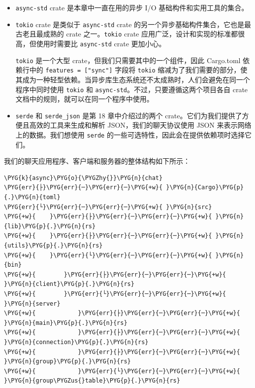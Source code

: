 \begin{itemize}
\item \texttt{async-std} crate 是本章中一直在用的异步 I/O 基础构件和实用工具的集合。
\item \texttt{tokio} crate 是类似于 \texttt{async-std} crate 的另一个异步基础构件集合，它也是最古老且最成熟的 crate 之一。\texttt{tokio} crate 应用广泛，设计和实现的标准都很高，但使用时需要比 \texttt{async-std} crate 更加小心。

\texttt{tokio} 是一个大型 crate，但我们只需要其中的一个组件，因此 Cargo.toml 依赖行中的 \texttt{features = ["sync"]} 字段将 \texttt{tokio} 缩减为了我们需要的部分，使其成为一种轻型依赖。当异步库生态系统还不太成熟时，人们会避免在同一个程序中同时使用 \texttt{tokio} 和 \texttt{async-std}。不过，只要遵循这两个项目各自 crate 文档中的规则，就可以在同一个程序中使用。
\item \texttt{serde} 和 \texttt{serde\_json} 是第 18 章中介绍过的两个 crate。它们为我们提供了方便且高效的工具来生成和解析 JSON，我们的聊天协议使用 JSON 来表示网络上的数据。我们想使用 \texttt{serde} 的一些可选特性，因此会在提供依赖项时选择它们。
\end{itemize}

我们的聊天应用程序、客户端和服务器的整体结构如下所示：

\begin{Verbatim}[commandchars=\\\{\},breaklines=true,breakanywhere=true,fontsize=\codefont,xleftmargin=17bp]
\PYG{k}{async}\PYG{o}{\PYGZhy{}}\PYG{n}{chat}
\PYG{err}{├}\PYG{err}{─}\PYG{err}{─}\PYG{+w}{ }\PYG{n}{Cargo}\PYG{p}{.}\PYG{n}{toml}
\PYG{err}{└}\PYG{err}{─}\PYG{err}{─}\PYG{+w}{ }\PYG{n}{src}
\PYG{+w}{    }\PYG{err}{├}\PYG{err}{─}\PYG{err}{─}\PYG{+w}{ }\PYG{n}{lib}\PYG{p}{.}\PYG{n}{rs}
\PYG{+w}{    }\PYG{err}{├}\PYG{err}{─}\PYG{err}{─}\PYG{+w}{ }\PYG{n}{utils}\PYG{p}{.}\PYG{n}{rs}
\PYG{+w}{    }\PYG{err}{└}\PYG{err}{─}\PYG{err}{─}\PYG{+w}{ }\PYG{n}{bin}
\PYG{+w}{        }\PYG{err}{├}\PYG{err}{─}\PYG{err}{─}\PYG{+w}{ }\PYG{n}{client}\PYG{p}{.}\PYG{n}{rs}
\PYG{+w}{        }\PYG{err}{└}\PYG{err}{─}\PYG{err}{─}\PYG{+w}{ }\PYG{n}{server}
\PYG{+w}{            }\PYG{err}{├}\PYG{err}{─}\PYG{err}{─}\PYG{+w}{ }\PYG{n}{main}\PYG{p}{.}\PYG{n}{rs}
\PYG{+w}{            }\PYG{err}{├}\PYG{err}{─}\PYG{err}{─}\PYG{+w}{ }\PYG{n}{connection}\PYG{p}{.}\PYG{n}{rs}
\PYG{+w}{            }\PYG{err}{├}\PYG{err}{─}\PYG{err}{─}\PYG{+w}{ }\PYG{n}{group}\PYG{p}{.}\PYG{n}{rs}
\PYG{+w}{            }\PYG{err}{└}\PYG{err}{─}\PYG{err}{─}\PYG{+w}{ }\PYG{n}{group\PYGZus{}table}\PYG{p}{.}\PYG{n}{rs}
\end{Verbatim}

